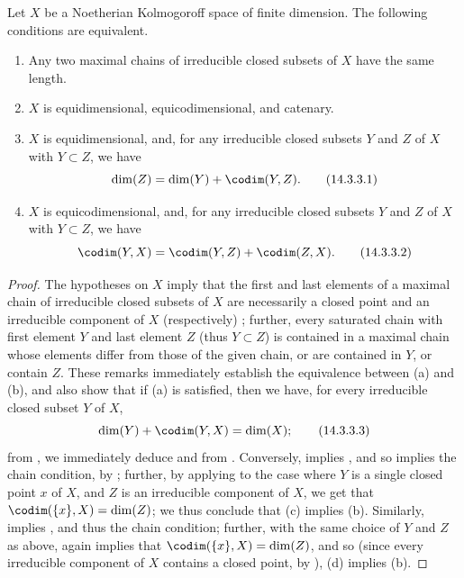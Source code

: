 \begin{proposition}[14.3.3]
\label{0.14.3.3}
Let $X$ be a Noetherian Kolmogoroff space of finite dimension.
The following conditions are equivalent.
\begin{enumerate}
  \item[{\rm(a)}] Any two maximal chains of irreducible closed subsets of $X$ have the same length.
  \item[{\rm(b)}] $X$ is equidimensional, equicodimensional, and catenary.
  \item[{\rm(c)}] $X$ is equidimensional, and, for any irreducible closed subsets $Y$ and $Z$ of $X$ with $Y\subset Z$, we have
    \[
    \label{0.14.3.3.1}
      \dim(Z)=\dim(Y)+\codim(Y,Z).
      \tag{14.3.3.1}
    \]
  \item[{\rm(d)}] $X$ is equicodimensional, and, for any irreducible closed subsets $Y$ and $Z$ of $X$ with $Y\subset Z$, we have
    \[
    \label{0.14.3.3.2}
      \codim(Y,X)=\codim(Y,Z)+\codim(Z,X).
      \tag{14.3.3.2}
    \]
\end{enumerate}
\end{proposition}

\begin{proof}
The hypotheses on $X$ imply that the first and last elements of a maximal chain of irreducible closed subsets of $X$ are necessarily a closed point and an irreducible component of $X$ (respectively) ;
further, every saturated chain with first element $Y$ and last element $Z$ (thus $Y\subset Z$) is contained in a maximal chain whose elements differ from those of the given chain, or are contained in $Y$, or contain $Z$.
These remarks immediately establish the equivalence between (a) and (b), and also show that if (a) is satisfied, then we have, for every irreducible closed subset $Y$ of $X$,
\[
\label{0.14.3.3.3}
  \dim(Y)+\codim(Y,X)=\dim(X);
  \tag{14.3.3.3}
\]
from , we immediately deduce  and  from .
Conversely,  implies , and so  implies the chain condition, by ;
further, by applying  to the case where $Y$ is a single closed point $x$ of $X$, and $Z$ is an irreducible component of $X$, we get that $\codim(\{x\},X)=\dim(Z)$;
we thus conclude that (c) implies (b).
Similarly,  implies , and thus the chain condition;
further, with the same choice of $Y$ and $Z$ as above,  again implies that $\codim(\{x\},X)=\dim(Z)$, and so (since every irreducible component of $X$ contains a closed point, by ), (d) implies (b).
\end{proof}

